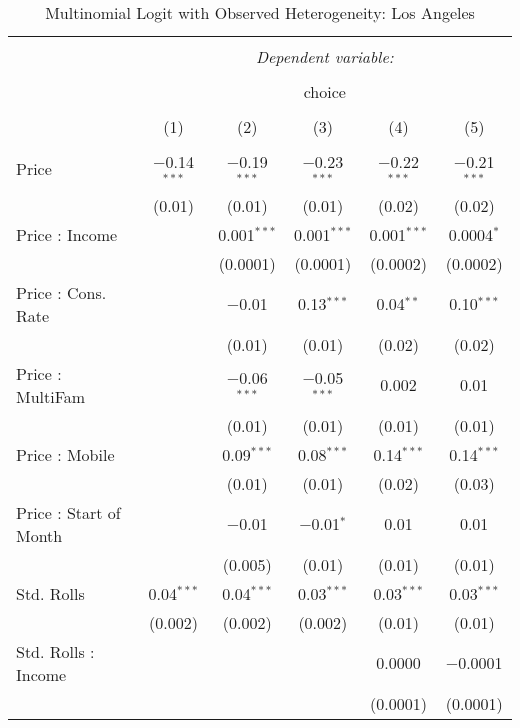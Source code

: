 
\begin{table}[!htbp] \centering 
  \caption{Multinomial Logit with Observed Heterogeneity: Los Angeles} 
  \label{tab:mnlLos AngelesObsHet} 
\begin{tabular}{@{\extracolsep{5pt}}lccccc} 
\\[-1.8ex]\hline 
\hline \\[-1.8ex] 
 & \multicolumn{5}{c}{\textit{Dependent variable:}} \\ 
\cline{2-6} 
\\[-1.8ex] & \multicolumn{5}{c}{choice} \\ 
\\[-1.8ex] & (1) & (2) & (3) & (4) & (5)\\ 
\hline \\[-1.8ex] 
 Price & $-$0.14$^{***}$ & $-$0.19$^{***}$ & $-$0.23$^{***}$ & $-$0.22$^{***}$ & $-$0.21$^{***}$ \\ 
  & (0.01) & (0.01) & (0.01) & (0.02) & (0.02) \\ 
  Price : Income &  & 0.001$^{***}$ & 0.001$^{***}$ & 0.001$^{***}$ & 0.0004$^{*}$ \\ 
  &  & (0.0001) & (0.0001) & (0.0002) & (0.0002) \\ 
  Price : Cons. Rate &  & $-$0.01 & 0.13$^{***}$ & 0.04$^{**}$ & 0.10$^{***}$ \\ 
  &  & (0.01) & (0.01) & (0.02) & (0.02) \\ 
  Price : MultiFam &  & $-$0.06$^{***}$ & $-$0.05$^{***}$ & 0.002 & 0.01 \\ 
  &  & (0.01) & (0.01) & (0.01) & (0.01) \\ 
  Price : Mobile &  & 0.09$^{***}$ & 0.08$^{***}$ & 0.14$^{***}$ & 0.14$^{***}$ \\ 
  &  & (0.01) & (0.01) & (0.02) & (0.03) \\ 
  Price : Start of Month &  & $-$0.01 & $-$0.01$^{*}$ & 0.01 & 0.01 \\ 
  &  & (0.005) & (0.01) & (0.01) & (0.01) \\ 
  Std. Rolls & 0.04$^{***}$ & 0.04$^{***}$ & 0.03$^{***}$ & 0.03$^{***}$ & 0.03$^{***}$ \\ 
  & (0.002) & (0.002) & (0.002) & (0.01) & (0.01) \\ 
  Std. Rolls : Income &  &  &  & 0.0000 & $-$0.0001 \\ 
  &  &  &  & (0.0001) & (0.0001) \\ 

\end{tabular}
\end{table}

